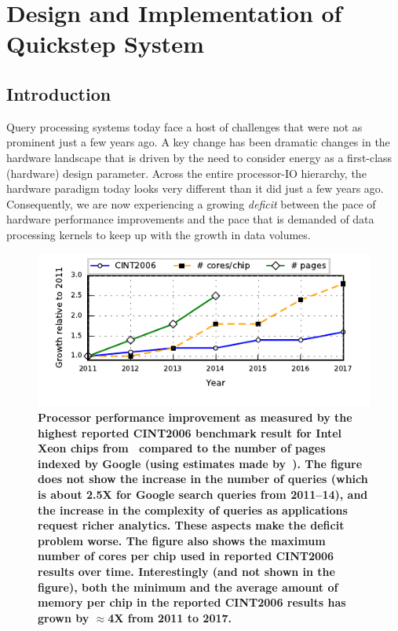 \chapter{Design and Implementation of Quickstep System}

\section{Introduction}
Query processing systems today face a host of challenges that were not as prominent just a few years ago. A key change has been dramatic changes in the hardware landscape that is driven by the need to consider energy as a first-class (hardware) design parameter. Across the entire processor-IO hierarchy, the hardware paradigm today looks very different than it did just a few years ago. Consequently, we are now experiencing a growing \textit{deficit} between the pace of hardware performance improvements and the pace that is demanded of data processing kernels to keep up with the growth in data volumes.

\begin{figure}
\centering
   \includegraphics[width=\columnwidth]{system/figures/deficit.pdf}
   \vspace*{-2em}
   \caption{\textbf{Processor performance improvement as measured by the highest reported CINT2006 benchmark result for Intel Xeon chips from~\cite{cpu2006} compared to the number of pages indexed by Google (using estimates made by~\cite{google-pages-db}). The figure does not show the increase in the number of queries (which is about 2.5X for Google search queries from 2011--14), and the increase in the complexity of queries as applications request richer analytics. These aspects make the deficit problem worse. The figure also shows the maximum number of cores per chip used in reported CINT2006 results over time. Interestingly (and not shown in the figure), both the minimum and the average amount of memory per chip in the reported CINT2006 results has grown by $\approx$4X from 2011 to 2017.}}
   \label{fig-deficit}
\end{figure}

